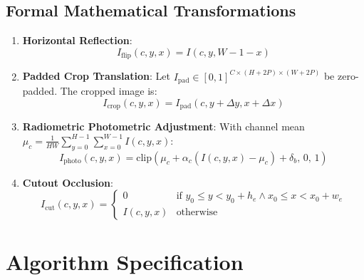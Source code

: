 \documentclass[11pt,a4paper]{article}
\theoremstyle{definition}
\begin{document}
\subsection{Formal Mathematical Transformations}
\begin{enumerate}
    \item \textbf{Horizontal Reflection}:
    \begin{equation}
    I_{\text{flip}}(c, y, x) = I(c, y, W - 1 - x)
    \end{equation}
    \item \textbf{Padded Crop Translation}:
    Let $I_{\text{pad}} \in [0, 1]^{C \times (H+2P) \times (W+2P)}$ be zero-padded. The cropped image is:
    \begin{equation}
    I_{\text{crop}}(c, y, x) = I_{\text{pad}}(c, y + \Delta y, x + \Delta x)
    \end{equation}
    \item \textbf{Radiometric Photometric Adjustment}:
    With channel mean $\mu_c = \frac{1}{HW} \sum_{y=0}^{H-1} \sum_{x=0}^{W-1} I(c, y, x)$:
    \begin{equation}
    I_{\text{photo}}(c, y, x) = \text{clip}\left( \mu_c + \alpha_c (I(c, y, x) - \mu_c) + \delta_b, \, 0, \, 1 \right)
    \end{equation}
    \item \textbf{Cutout Occlusion}:
    \begin{equation}
    I_{\text{cut}}(c, y, x) = \begin{cases} 0 & \text{if } y_0 \le y < y_0 + h_e \land x_0 \le x < x_0 + w_e \\ I(c, y, x) & \text{otherwise} \end{cases}
    \end{equation}
\end{enumerate}

\section{Algorithm Specification}
\end{document}
